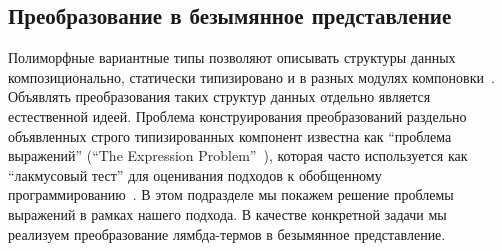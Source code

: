 %

%
%
%

%
%
%

\subsection{Преобразование в безымянное представление}

Полиморфные вариантные типы позволяют описывать структуры данных композиционально, статически типизировано и в разных модулях 
компоновки~\cite{PolyVarReuse}.
Объявлять преобразования таких структур данных отдельно является естественной идеей. Проблема конструирования преобразований 
раздельно объявленных строго типизированных компонент известна как ``проблема выражений'' (``The Expression Problem''~\cite{ExpressionProblem}), которая часто используется как ``лакмусовый тест'' для оценивания подходов к обобщенному программированию~\cite{ObjectAlgebras,ALaCarte}. 
В этом подразделе мы покажем решение проблемы выражений в рамках нашего подхода. В качестве конкретной задачи мы реализуем преобразование лямбда-термов в безымянное представление.

